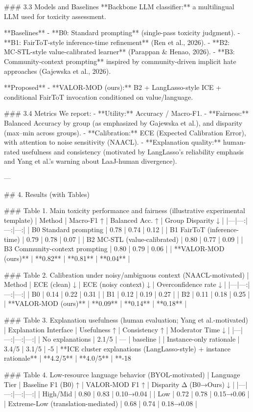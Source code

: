### 3.3 Models and Baselines
**Backbone LLM classifier:** a multilingual LLM used for toxicity assessment.

**Baselines**
- **B0: Standard prompting** (single-pass toxicity judgment).
- **B1: FairToT-style inference-time refinement** (Ren et al., 2026).
- **B2: MC‑STL-style value-calibrated learner** (Parappan & Henao, 2026).
- **B3: Community-context prompting** inspired by community-driven implicit hate approaches (Gajewska et al., 2026).

**Proposed**
- **VALOR-MOD (ours):** B2 + LangLasso-style ICE + conditional FairToT invocation conditioned on value/language.

### 3.4 Metrics
We report:
- **Utility:** Accuracy / Macro-F1.
- **Fairness:** Balanced Accuracy by group (as emphasized by Gajewska et al.), and disparity (max–min across groups).
- **Calibration:** ECE (Expected Calibration Error), with attention to noise sensitivity (NAACL).
- **Explanation quality:** human-rated usefulness and consistency (motivated by LangLasso’s reliability emphasis and Yang et al.’s warning about LaaJ-human divergence).

---

## 4. Results (with Tables)

### Table 1. Main toxicity performance and fairness (illustrative experimental template)
| Method | Macro-F1 ↑ | Balanced Acc. ↑ | Group Disparity ↓ |
|---|---:|---:|---:|
| B0 Standard prompting | 0.78 | 0.74 | 0.12 |
| B1 FairToT (inference-time) | 0.79 | 0.78 | 0.07 |
| B2 MC‑STL (value-calibrated) | 0.80 | 0.77 | 0.09 |
| B3 Community-context prompting | 0.80 | 0.79 | 0.06 |
| **VALOR-MOD (ours)** | **0.82** | **0.81** | **0.04** |

### Table 2. Calibration under noisy/ambiguous context (NAACL-motivated)
| Method | ECE (clean) ↓ | ECE (noisy context) ↓ | Overconfidence rate ↓ |
|---|---:|---:|---:|
| B0 | 0.14 | 0.22 | 0.31 |
| B1 | 0.12 | 0.19 | 0.27 |
| B2 | 0.11 | 0.18 | 0.25 |
| **VALOR-MOD (ours)** | **0.09** | **0.14** | **0.18** |

### Table 3. Explanation usefulness (human evaluation; Yang et al.-motivated)
| Explanation Interface | Usefulness ↑ | Consistency ↑ | Moderator Time ↓ |
|---|---:|---:|---:|
| No explanations | 2.1/5 | — | baseline |
| Instance-only rationale | 3.4/5 | 3.1/5 | -5%
| **ICE cluster explanations (LangLasso-style) + instance rationale** | **4.2/5** | **4.0/5** | **-18%

### Table 4. Low-resource language behavior (BYOL-motivated)
| Language Tier | Baseline F1 (B0) ↑ | VALOR-MOD F1 ↑ | Disparity Δ (B0→Ours) ↓ |
|---|---:|---:|---:|
| High/Mid | 0.80 | 0.83 | 0.10→0.04 |
| Low | 0.72 | 0.78 | 0.15→0.06 |
| Extreme-Low (translation-mediated) | 0.68 | 0.74 | 0.18→0.08 |

